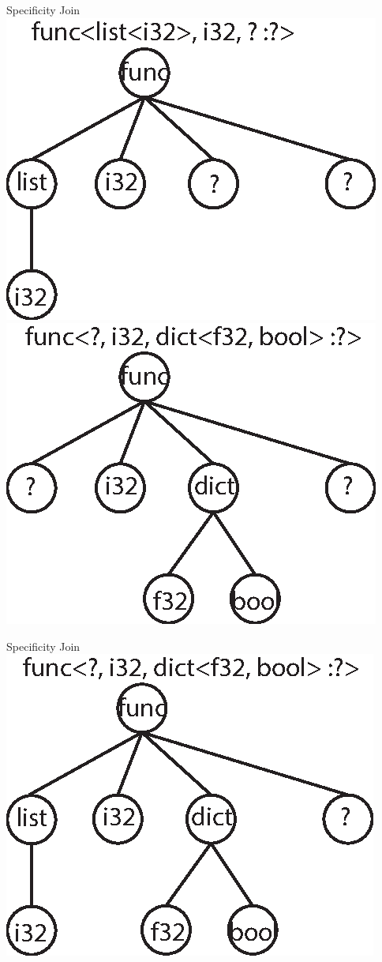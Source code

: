 \documentclass{beamer}
\begin{document}
\begin{frame}{Specificity Join}
\centering
\includegraphics{Fig_Type1}
\includegraphics{Fig_Type2}
\end{frame}

\begin{frame}{Specificity Join}
\centering
\includegraphics{Fig_TypeJoin}
\end{frame}
\end{document}
